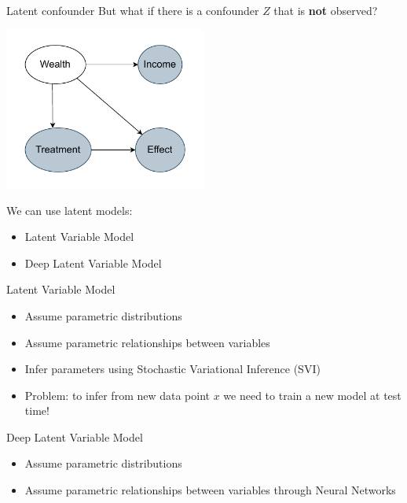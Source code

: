 \documentclass[10pt]{beamer}
\begin{document}
\begin{frame}{Latent confounder}
But what if there is a confounder $Z$ that is \textbf{not} observed?
    \begin{center}
  \includegraphics[width=0.5\textwidth]{images/latent_confounder.pdf}
\end{center}
  
We can use latent models:
\begin{itemize}
    \item Latent Variable Model
    \item Deep Latent Variable Model
\end{itemize} 
 \end{frame}

 \begin{frame}{Latent Variable Model}
     \begin{itemize}
         \item Assume parametric distributions
         \item Assume parametric relationships between variables
         \item Infer parameters using Stochastic Variational Inference (SVI)
         \item Problem: to infer from new data point $x$ we need to train a new model at test time! 
     \end{itemize}
 \end{frame}

  \begin{frame}{Deep Latent Variable Model}
     \begin{itemize}
         \item Assume parametric distributions
         \item Assume parametric relationships between variables through \alert{Neural Networks}
     \end{itemize}
 \end{frame}
\end{document}
